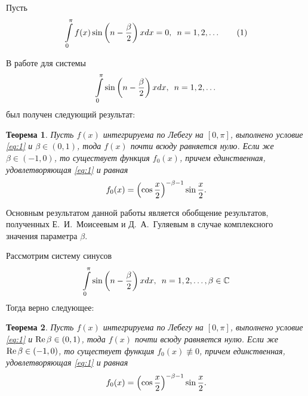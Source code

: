 ﻿\documentclass[oneside, final, 14pt]{extreport}
\newtheorem{theorem}{Теорема}
\begin{document}
Пусть \begin{equation}\int\limits_0^{\pi}f(x)\sin\left(n - \frac{\beta}{2}\right)xdx = 0, \enspace n = 1, 2, \dots \tag{1} \label{eq:1}\end{equation}

	В работе \cite{moiseev-2018} для системы $$\int\limits_0^{\pi}\sin\left(n - \frac{\beta}{2}\right)xdx, \enspace n = 1, 2, \dots$$ был получен следующий результат:
	
	\begin{theorem}
		Пусть $f(x)$ интегрируема по Лебегу на $[0, \pi]$, выполнено условие
		\eqref{eq:1} и $\beta\in(0, 1)$, тода $f(x)$ почти всюду равняется нулю. 
		Если же  $\beta\in(-1, 0)$, то существует функция $f_0(x)$, причем
		единственная, удовлетворяющая \eqref{eq:1} и равная $$f_0(x) = \left(\cos\frac{x}{2}\right)^{-\beta-1}\sin\frac{x}{2}.$$
	\end{theorem}
	
	Основным результатом данной работы является обобщение результатов, полученных Е.~И.~Моисеевым 
	и Д.~А.~Гуляевым в случае комплексного значения параметра $\beta$.
	
	
	Рассмотрим систему синусов $$\int\limits_0^{\pi}\sin\left(n - \frac{\beta}{2}\right)xdx, \enspace n = 1, 2, \dots, \beta\in\mathbb{C}$$
	Тогда верно следующее:
	\begin{theorem}
		Пусть $f(x)$ интегрируема по Лебегу на $[0, \pi]$, выполнено условие
		\eqref{eq:1} и \thinspace $\operatorname{Re}\beta \in (0, 1)$, 
		тода $f(x)$ почти всюду равняется нулю. Если же \thinspace  
		$\operatorname{Re}\beta \in (-1, 0)$, то существует функция $f_0(x) \not\equiv 0$, 
		причем единственная, удовлетворяющая \eqref{eq:1} и равная $$f_0(x) = \left(\cos\frac{x}{2}\right)^{-\beta-1}\sin\frac{x}{2}.$$
	\end{theorem}
	
\end{document}
